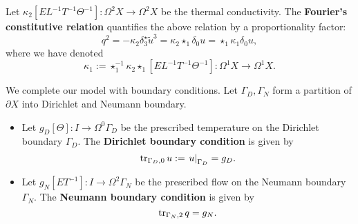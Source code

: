 \begin{discussion}
\begin{itemize}
      Let
      $\kappa_2 [E L^{-1} T^{-1} \Theta^{-1}] \colon \Omega^2 X \to \Omega^2 X$
      be the thermal conductivity.
      The \textbf{Fourier's constitutive relation}
      quantifies the above relation by a proportionality factor:
      \begin{equation}
        q^2 = - \kappa_2 \delta_3^\star \tilde{u}^3
        = \kappa_2 \star_1 \delta_0 u = \star_1 \kappa_1 \delta_0 u,
      \end{equation}
      where we have denoted
      \begin{equation}
        \kappa_1 := \star_1^{-1} \kappa_2 \star_1 [E L^{-1} T^{-1} \Theta^{-1}]
        \colon \Omega^1 X \to \Omega^1 X.
      \end{equation}
  \end{itemize}
  We complete our model with boundary conditions.
  Let $\Gamma_D, \Gamma_N$ form a partition of $\partial X$
  into Dirichlet and Neumann boundary.
  \begin{itemize}
    \item
      Let $g_D [\Theta] \colon I \to \Omega^0 \Gamma_D$
      be the prescribed temperature on the Dirichlet boundary $\Gamma_D$.
      The \textbf{Dirichlet boundary condition} is given by
      \begin{equation}
        \mathop{\rm tr}\nolimits_{\Gamma_D, 0} u := \left. u \right|_{\Gamma_D} = g_D.
      \end{equation}
    \item
      Let $g_N [E T^{-1}] \colon I \to \Omega^2 \Gamma_N$
      be the prescribed flow on the Neumann boundary $\Gamma_N$.
      The \textbf{Neumann boundary condition} is given by
      \begin{equation}
        \mathop{\rm tr}\nolimits_{\Gamma_N, 2} q = g_N.
      \end{equation}
  \end{itemize}
\end{discussion}
